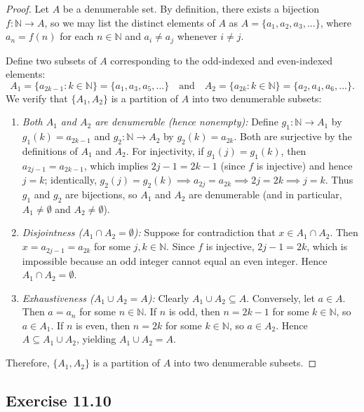 \documentclass[11pt, letterpaper]{article}
\theoremstyle{definition}
\theoremstyle{remark}
\begin{document}
\begin{proof}
Let $A$ be a denumerable set. By definition, there exists a bijection $f : \mathbb{N} \to A$, so we may list the distinct elements of $A$ as $A = \{a_1, a_2, a_3, \dots\}$, where $a_n = f(n)$ for each $n \in \mathbb{N}$ and $a_i \neq a_j$ whenever $i \neq j$.

Define two subsets of $A$ corresponding to the odd-indexed and even-indexed elements:
\[
A_1 = \{a_{2k - 1} : k \in \mathbb{N}\} = \{a_1, a_3, a_5, \dots\} \quad \text{and} \quad A_2 = \{a_{2k} : k \in \mathbb{N}\} = \{a_2, a_4, a_6, \dots\}.
\]
We verify that $\{A_1, A_2\}$ is a partition of $A$ into two denumerable subsets:
\begin{enumerate}[label=(\arabic*)]
    \item \emph{Both $A_1$ and $A_2$ are denumerable (hence nonempty):} Define $g_1 : \mathbb{N} \to A_1$ by $g_1(k) = a_{2k-1}$ and $g_2 : \mathbb{N} \to A_2$ by $g_2(k) = a_{2k}$. Both are surjective by the definitions of $A_1$ and $A_2$. For injectivity, if $g_1(j) = g_1(k)$, then $a_{2j-1} = a_{2k-1}$, which implies $2j - 1 = 2k - 1$ (since $f$ is injective) and hence $j = k$; identically, $g_2(j) = g_2(k) \implies a_{2j} = a_{2k} \implies 2j = 2k \implies j = k$. Thus $g_1$ and $g_2$ are bijections, so $A_1$ and $A_2$ are denumerable (and in particular, $A_1 \neq \emptyset$ and $A_2 \neq \emptyset$).
    \item \emph{Disjointness ($A_1 \cap A_2 = \emptyset$):} Suppose for contradiction that $x \in A_1 \cap A_2$. Then $x = a_{2j-1} = a_{2k}$ for some $j, k \in \mathbb{N}$. Since $f$ is injective, $2j - 1 = 2k$, which is impossible because an odd integer cannot equal an even integer. Hence $A_1 \cap A_2 = \emptyset$.
    \item \emph{Exhaustiveness ($A_1 \cup A_2 = A$):} Clearly $A_1 \cup A_2 \subseteq A$. Conversely, let $a \in A$. Then $a = a_n$ for some $n \in \mathbb{N}$. If $n$ is odd, then $n = 2k - 1$ for some $k \in \mathbb{N}$, so $a \in A_1$. If $n$ is even, then $n = 2k$ for some $k \in \mathbb{N}$, so $a \in A_2$. Hence $A \subseteq A_1 \cup A_2$, yielding $A_1 \cup A_2 = A$.
\end{enumerate}
Therefore, $\{A_1, A_2\}$ is a partition of $A$ into two denumerable subsets.
\end{proof}

\subsection{Exercise 11.10}
\end{document}
